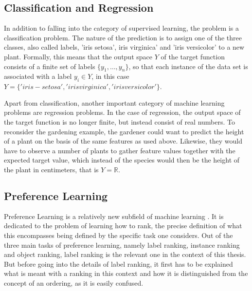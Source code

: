 \subsection{Classification and Regression}
In addition to falling into the category of supervised learning, the problem is a classification problem. The nature of the prediction is to assign one of the three classes, also called labels, 'iris setosa', iris virginica' and 'iris versicolor' to a new plant. Formally, this means that the output space $Y$ of the target function consists of a finite set of labels $\lbrace y_1,\dots,y_n\rbrace$, so that each instance of the data set is associated with a label $y_i \in Y$, in this case $Y=\lbrace 'iris-setosa','iris virginica', 'iris versicolor' \rbrace $. 

Apart from classification, another important category of machine learning problems are regression problems. In the case of regression, the output space of the target function is no longer finite, but instead consist of real numbers. To reconsider the gardening example, the gardener could want to predict the height of a plant on the basis of the same features as used above. Likewise, they would have to observe a number of plants to gather feature values together with the expected target value, which instead of the species would then be the height of the plant in centimeters, that is $Y=\mathbb{R}$.

\subsection{Preference Learning}
Preference Learning is a relatively new subfield of machine learning \cite{DBLP:books/daglib/0025729}. It is dedicated to the problem of learning how to rank, the precise definition of what this encompasses being defined by the specific task one considers. Out of the three main tasks of preference learning, namely label ranking, instance ranking and object ranking, label ranking is the relevant one in the context of this thesis. But before going into the details of label ranking, it first has to be explained what is meant with a ranking in this context and how it is distinguished from the concept of an ordering, as it is easily confused.

